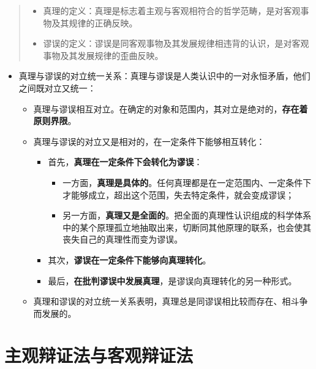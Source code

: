 \documentclass[
]{article}
\begin{document}
\begin{quote}
\begin{itemize}
\item
  真理的定义：真理是标志着主观与客观相符合的哲学范畴，是对客观事物及其规律的正确反映。
\item
  谬误的定义：谬误是同客观事物及其发展规律相违背的认识，是对客观事物及其发展规律的歪曲反映。
\end{itemize}
\end{quote}

\begin{itemize}
\item
  真理与谬误的对立统一关系：真理与谬误是人类认识中的一对永恒矛盾，他们之间既对立又统一：

  \begin{itemize}
  \item
    真理与谬误相互对立。在确定的对象和范围内，其对立是绝对的，\textbf{存在着原则界限}。
  \item
    真理与谬误的对立又是相对的，在一定条件下能够相互转化：

    \begin{itemize}
    \item
      首先，\textbf{真理在一定条件下会转化为谬误}：

      \begin{itemize}
      \item
        一方面，\textbf{真理是具体的}。任何真理都是在一定范围内、一定条件下才能够成立，超出这个范围，失去特定条件，就会变成谬误；
      \item
        另一方面，\textbf{真理又是全面的}。把全面的真理性认识组成的科学体系中的某个原理孤立地抽取出来，切断同其他原理的联系，也会使其丧失自己的真理性而变为谬误。
      \end{itemize}
    \item
      其次，\textbf{谬误在一定条件下能够向真理转化}。
    \item
      最后，\textbf{在批判谬误中发展真理}，是谬误向真理转化的另一种形式。
    \end{itemize}
  \item
    真理和谬误的对立统一关系表明，真理总是同谬误相比较而存在、相斗争而发展的。
  \end{itemize}
\end{itemize}

\hypertarget{ux4e3bux89c2ux8fa9ux8bc1ux6cd5ux4e0eux5ba2ux89c2ux8fa9ux8bc1ux6cd5}{%
\section{主观辩证法与客观辩证法}\label{ux4e3bux89c2ux8fa9ux8bc1ux6cd5ux4e0eux5ba2ux89c2ux8fa9ux8bc1ux6cd5}}
\end{document}
